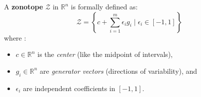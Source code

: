 \documentclass[oneside,11pt,dvipsnames]{book}
\numberwithin{equation}{section}
\theoremstyle{definition}
\newtheorem{example}{Example}[section]
\theoremstyle{remark}
\begin{document}
A \textbf{zonotope} \(\mathcal{Z}\) in \(\mathbb{R}^n\) is formally defined as:
\[
\mathcal{Z} = \left\{c + \sum_{i=1}^{m} \epsilon_i g_i \mid \epsilon_i \in [-1, 1]\right\}
\]
where :
\begin{itemize}
\item \(c \in \mathbb{R}^n\) is the \textit{center} (like the midpoint of intervals), 
\item \(g_i \in \mathbb{R}^n\) are \textit{generator vectors} (directions of variability), and 
\item \(\epsilon_i\) are independent coefficients in \([-1, 1]\). 
\end{itemize}





\end{document}
